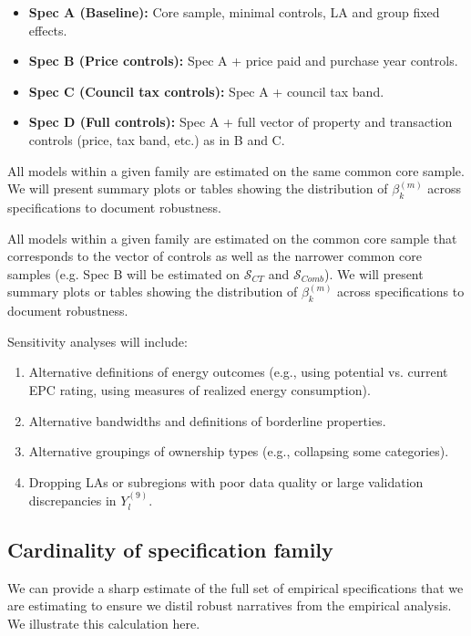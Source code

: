 \documentclass[12pt]{article}
\begin{document}
\begin{itemize}
    \item \textbf{Spec A (Baseline):} Core sample, minimal controls, LA and group fixed effects.
    \item \textbf{Spec B (Price controls):} Spec A + price paid and purchase year controls.
    \item \textbf{Spec C (Council tax controls):} Spec A + council tax band.
    \item \textbf{Spec D (Full controls):} Spec A + full vector of property and transaction controls (price, tax band, etc.) as in B and C.
\end{itemize}

All models within a given family are estimated on the same common core sample. We will present summary plots or tables showing the distribution of $\beta^{(m)}_k$ across specifications to document robustness.

All models within a given family are estimated on the common core sample that corresponds to the vector of controls as well as the narrower common core samples (e.g. Spec B will be estimated on $\mathcal{S}_{CT} $ and $\mathcal{S}_{Comb}$).   We will present summary plots or tables showing the distribution of $\beta^{(m)}_k$ across specifications to document robustness.

Sensitivity analyses will include:

\begin{enumerate}
    \item Alternative definitions of energy outcomes (e.g., using potential vs. current EPC rating, using measures of realized energy consumption). 
    \item Alternative bandwidths and definitions of borderline properties.
    \item Alternative groupings of ownership types (e.g., collapsing some categories).
    \item Dropping LAs or subregions with poor data quality or large validation discrepancies in $Y^{(9)}_l$.
\end{enumerate}

\subsection{Cardinality of specification family}
We can provide a sharp estimate of the full set of empirical specifications that we are estimating to ensure we distil robust narratives from the empirical analysis. We illustrate this calculation here.
\end{document}
